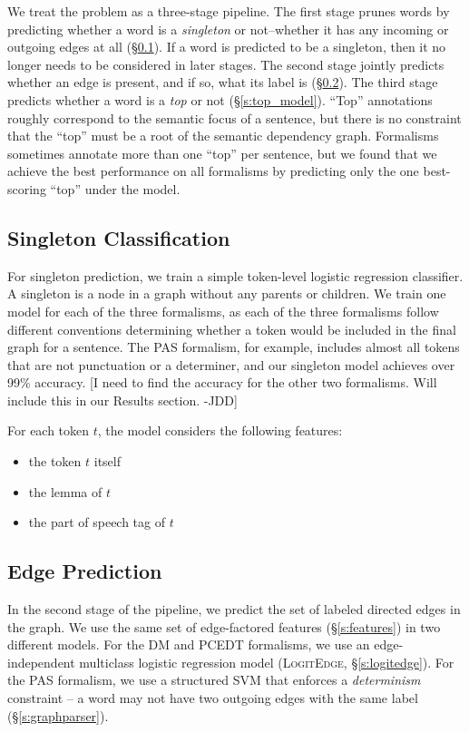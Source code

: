 \documentclass[11pt]{article}
\newcommand{\jdcomment}[1]{\textcolor{NavyBlue}{[#1 -JDD]}}
\newcommand{\logitedge}{\textsc{LogitEdge}}
\begin{document}
We treat the problem as a three-stage pipeline.
The first stage prunes words by predicting whether a word is a \emph{singleton}
or not--whether it has any incoming or outgoing edges at all (\S\ref{s:singleton_model}).
If a word is predicted to be a singleton, then it no longer needs to be
considered in later stages.
The second stage jointly predicts whether an edge is
present, and if so, what its label is (\S\ref{s:edge_model}).
The third stage predicts whether a word is a \emph{top} or not
(\S\ref{s:top_model}).
``Top'' annotations roughly correspond to the semantic focus of a
sentence, but there is no constraint that the ``top'' must be a root of the
semantic dependency graph.
Formalisms sometimes annotate more than one ``top'' per sentence, but we
found that we achieve the best performance on all formalisms by predicting only
the one best-scoring ``top'' under the model.


\subsection{Singleton Classification} \label{s:singleton_model}

For singleton prediction, we train a simple token-level logistic regression
classifier.
A singleton is a node in a graph without any parents or children.
We train one model for each of the three formalisms, as each of the three
formalisms follow different conventions determining whether a token would be
included in the final graph for a sentence.
The PAS formalism, for example, includes almost all tokens that are not
punctuation or a determiner, and our singleton model achieves over 99\%
accuracy.
\jdcomment{I need to find the accuracy for the other two formalisms. Will
include this in our Results section.}

For each token $t$, the model considers the following features:
\begin{itemize}
\item the token $t$ itself
\item the lemma of $t$
\item the part of speech tag of $t$
\end{itemize}



\subsection{Edge Prediction} \label{s:edge_model}

In the second stage of the pipeline, we predict the set of labeled directed
edges in the graph.
We use the same set of edge-factored features (\S\ref{s:features}) in two
different models.
For the DM and PCEDT formalisms, we use an edge-independent multiclass logistic
regression model (\logitedge, \S\ref{s:logitedge}).
For the PAS formalism, we use a structured SVM 
\cite{taskar_max_2003,tsochantaridis_support_2004} that enforces a
\emph{determinism} constraint -- a word may not have two outgoing edges with the
same label (\S\ref{s:graphparser}).
\end{document}
